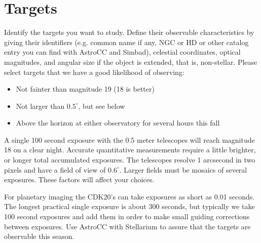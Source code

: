\documentclass[12pt]{article}
\begin{document}




\section{Targets}

Identify the targets you want to study.  Define their observable characteristics
by giving their identifiers (e.g. common name if any, NGC or HD or other catalog
entry you can find with AstroCC and Simbad), celestial coordinates, optical
magnitudes, and angular size if the object is extended, that is, non-stellar.
Please select targets that we have a good likelihood of observing:
\begin{itemize}
\item Not fainter than magnitude 19 (18 is better)
\item Not larger than $0.5^\circ$, but see below
\item Above the horizon at either observatory for several hours this fall
\end{itemize}

A single 100 second exposure with the 0.5 meter telescopes will reach magnitude
18 on a clear night.  Accurate quantitative measurements require a little
brighter, or longer total accumulated exposures.  The telescopes resolve 1
arcsecond in two pixels and have a field of view of $0.6^\circ$.  Larger fields
must be mosaics of several exposures. These factors will affect your
choices.  

For planetary imaging the CDK20's can take exposures as short as 0.01 seconds. 
The longest practical single exposure is about 300 seconds, but typically we
take 100 second exposures and add them in order to make small guiding
corrections between exposures. Use AstroCC with Stellarium to assure that the
targets are observable this season.
\end{document}
